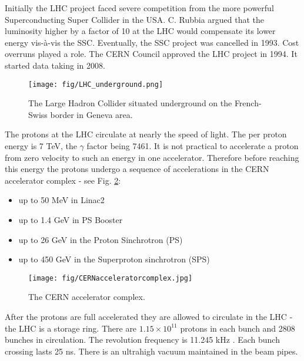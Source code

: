 Initially the LHC project faced severe competition from the more powerful Superconducting Super Collider in the USA. C. Rubbia argued that the luminosity higher by a factor of 10 at the LHC would compensate its lower energy vis-à-vis the SSC. Eventually, the SSC project was cancelled in 1993. Cost overruns played a role. The CERN Council approved the LHC project in 1994. It started data taking in 2008.

\begin{figure}[htpb]
  \centering
  \texttt{[image: fig/LHC\_underground.png]}
  \caption{The Large Hadron Collider situated underground on the French-Swiss border in Geneva area.}
  \label{fig:LHC_underground}
\end{figure}


The protons at the LHC circulate at nearly the speed of light. The per proton energy is 7 TeV, the $\gamma$ factor being 7461. It is not practical to accelerate a proton from zero velocity to such an energy in one accelerator. Therefore before reaching this energy the protons undergo a sequence of accelerations in the CERN accelerator complex - see Fig. \ref{fig:CERN_accelerator_complex}:

\begin{itemize}
\item up to 50 MeV in Linac2
\item up to 1.4 GeV in PS Booster
\item up to 26 GeV in the Proton Sinchrotron (PS)
\item up to 450 GeV in the Superproton sinchrotron (SPS)
\end{itemize}

\begin{figure}[htpb]
  \centering
  \texttt{[image: fig/CERNacceleratorcomplex.jpg]}
  \caption{The CERN accelerator complex.}
  \label{fig:CERN_accelerator_complex}
\end{figure}

After the protons are full accelerated they are allowed to circulate in the LHC - the LHC is a storage ring. There are $1.15\times10^{11}$ protons in each bunch and 2808 bunches in circulation. The revolution frequency is 11.245 kHz \cite{Bruning:2004ej}. Each bunch crossing lasts 25 ns. There is an ultrahigh vacuum maintained in the beam pipes.

